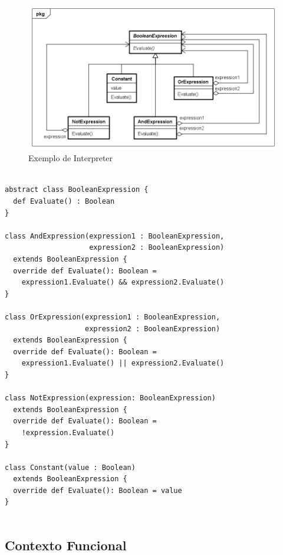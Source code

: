 \begin{figure}[htb]
	\caption{\label{interpreter_exemplo}Exemplo de Interpreter}
	\begin{center}
	    \includegraphics[scale=0.5]{5_padroes-contexto-funcional/5.3_comportamentais/5.3.03_interpreter/Interpreter_exemplo.png}
	\end{center}
\end{figure}

\begin{lstlisting}[caption={Interpreter Orientação a Objetos},label=oointerpreter]

abstract class BooleanExpression {
  def Evaluate() : Boolean
}

class AndExpression(expression1 : BooleanExpression,
                    expression2 : BooleanExpression)
  extends BooleanExpression {
  override def Evaluate(): Boolean =
    expression1.Evaluate() && expression2.Evaluate()
}

class OrExpression(expression1 : BooleanExpression,
                   expression2 : BooleanExpression)
  extends BooleanExpression {
  override def Evaluate(): Boolean =
    expression1.Evaluate() || expression2.Evaluate()
}

class NotExpression(expression: BooleanExpression)
  extends BooleanExpression {
  override def Evaluate(): Boolean =
    !expression.Evaluate()
}

class Constant(value : Boolean)
  extends BooleanExpression {
  override def Evaluate(): Boolean = value
}
    
\end{lstlisting}

\subsection*{Contexto Funcional}

